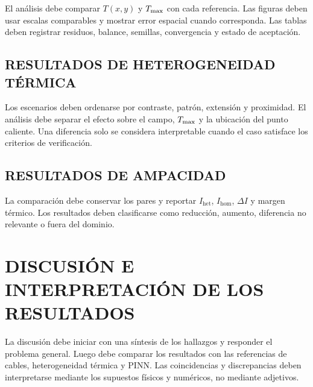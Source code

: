 El análisis debe comparar $T(x,y)$ y $T_{\max}$ con cada referencia. Las figuras deben usar escalas comparables y mostrar error espacial cuando corresponda. Las tablas deben registrar residuos, balance, semillas, convergencia y estado de aceptación.


\subsection{RESULTADOS DE HETEROGENEIDAD TÉRMICA}

Los escenarios deben ordenarse por contraste, patrón, extensión y proximidad. El análisis debe separar el efecto sobre el campo, $T_{\max}$ y la ubicación del punto caliente. Una diferencia solo se considera interpretable cuando el caso satisface los criterios de verificación.


\subsection{RESULTADOS DE AMPACIDAD}

La comparación debe conservar los pares y reportar $I_{\mathrm{het}}$, $I_{\mathrm{hom}}$, $\Delta I$ y margen térmico. Los resultados deben clasificarse como reducción, aumento, diferencia no relevante o fuera del dominio.


\section{DISCUSIÓN E INTERPRETACIÓN DE LOS RESULTADOS}
\label{sec:discusion}

La discusión debe iniciar con una síntesis de los hallazgos y responder el problema general. Luego debe comparar los resultados con las referencias de cables, heterogeneidad térmica y PINN. Las coincidencias y discrepancias deben interpretarse mediante los supuestos físicos y numéricos, no mediante adjetivos.

